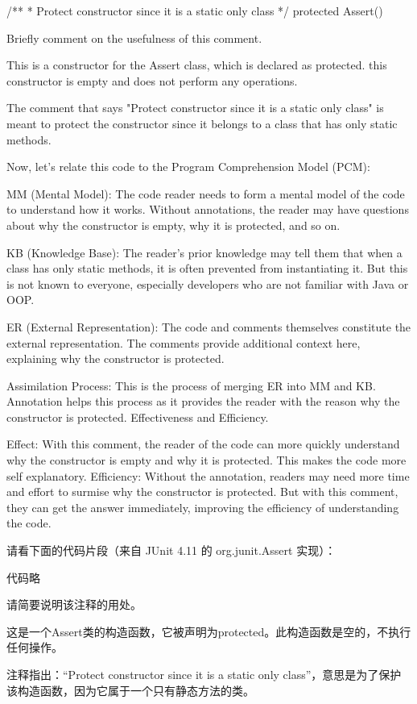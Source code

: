/**
* Protect constructor since it is a static only class
*/
protected Assert() {
    }

Briefly comment on the usefulness of this comment.

This is a constructor for the Assert class, which is declared as protected. this constructor is empty and does not perform any operations.

The comment that says "Protect constructor since it is a static only class" is meant to protect the constructor since it belongs to a class that has only static methods.

Now, let's relate this code to the Program Comprehension Model (PCM):

MM (Mental Model): The code reader needs to form a mental model of the code to understand how it works. Without annotations, the reader may have questions about why the constructor is empty, why it is protected, and so on.

KB (Knowledge Base): The reader's prior knowledge may tell them that when a class has only static methods, it is often prevented from instantiating it. But this is not known to everyone, especially developers who are not familiar with Java or OOP.

ER (External Representation): The code and comments themselves constitute the external representation. The comments provide additional context here, explaining why the constructor is protected.

Assimilation Process: This is the process of merging ER into MM and KB. Annotation helps this process as it provides the reader with the reason why the constructor is protected.
Effectiveness and Efficiency.

Effect: With this comment, the reader of the code can more quickly understand why the constructor is empty and why it is protected. This makes the code more self explanatory.
Efficiency: Without the annotation, readers may need more time and effort to surmise why the constructor is protected. But with this comment, they can get the answer immediately, improving the efficiency of understanding the code.

请看下面的代码片段（来自 JUnit 4.11 的 org.junit.Assert 实现）：

代码略

请简要说明该注释的用处。

这是一个Assert类的构造函数，它被声明为protected。此构造函数是空的，不执行任何操作。

注释指出：“Protect constructor since it is a static only class”，意思是为了保护该构造函数，因为它属于一个只有静态方法的类。

